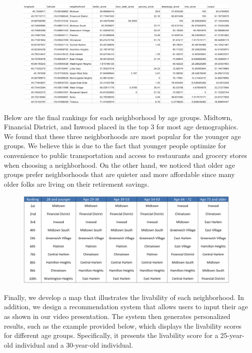 \documentclass{article}
\begin{document}
\begin{figure}[h]
\centering
\includegraphics[scale=0.30]{final_results_broken_down.JPG}
\end{figure}

Below are the final rankings for each neighborhood by age groups.  Midtown, Financial District, and Inwood placed in the top 3 for most age demographics.  We found that these three neighborhoods are most popular for the younger age groups.  We believe this is due to the fact that younger people optimize for convenience to public transportation and access to restaurants and grocery stores when choosing a neighborhood.  On the other hand, we noticed that older age groups prefer neighborhoods that are quieter and more affordable since many older folks are living on their retirement savings.
\newpage
\begin{figure}[h]
\centering
\includegraphics[scale=0.20]{final_results.png}
\end{figure}

Finally, we develop a map that illustrates the livability of each neighborhood. In addition, we design a recommendation system that allows users to input their age as shown in our video presentation. The system then generates personalized results, such as the example provided below, which displays the livability scores for different age groups. Specifically, it presents the livability score for a 25-year-old individual and a 30-year-old individual.
\end{document}
